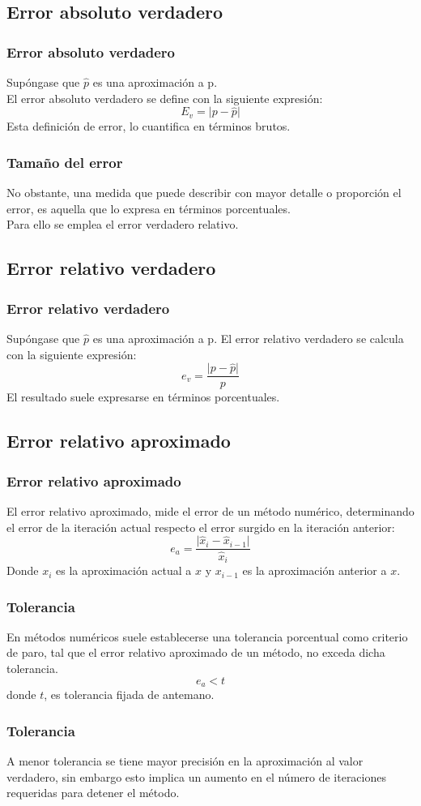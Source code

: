 \subsection{Error absoluto verdadero}
\begin{frame}
\frametitle{Error absoluto verdadero}
Supóngase que $\widehat{p}$ es una aproximación a p.
\\
\bigskip
El error absoluto verdadero se define con la siguiente expresión:
\[ E_{v} = \vert p - \widehat{p} \vert \]
Esta definición de error, lo cuantifica en términos brutos.
\end{frame}
\begin{frame}
\frametitle{Tamaño del error}
 No obstante, una medida que puede describir con mayor detalle o proporción el error, es aquella que lo expresa en términos porcentuales.
 \\
 \bigskip
 Para ello se emplea el error verdadero relativo.
\end{frame}
\subsection{Error relativo verdadero}
\begin{frame}
\frametitle{Error relativo verdadero}
Supóngase que $\widehat{p}$ es una aproximación a p. El error relativo verdadero se calcula con la siguiente expresión:
\[ e_{v} = \dfrac{\vert p - \widehat{p} \vert }{p}\]
El resultado suele expresarse en términos porcentuales.
\end{frame}
\subsection{Error relativo aproximado}
\begin{frame}
\frametitle{Error relativo aproximado}
El error relativo aproximado, mide el error de un método numérico, determinando el error de la iteración actual respecto el error surgido en la iteración anterior:
\[ e_{a} = \dfrac{\vert \widehat{x}_{i} - \widehat{x}_{i-1} \vert}{\widehat{x}_{i}}\]
Donde $x_{i}$ es la aproximación actual a $x$ y 
$x_{i-1}$ es la aproximación anterior a $x$.
\end{frame}
\begin{frame}
\frametitle{Tolerancia}
En métodos numéricos suele establecerse una tolerancia porcentual como criterio de paro, tal
que el error relativo aproximado de un método, no exceda dicha tolerancia.
\[ e_{a} < t \]
donde $t$, es tolerancia fijada de antemano.
\end{frame}
\begin{frame}
\frametitle{Tolerancia}
A menor tolerancia se tiene mayor precisión en la aproximación al valor verdadero, sin embargo esto implica un aumento en el número de iteraciones requeridas para detener el método.
\end{frame}
